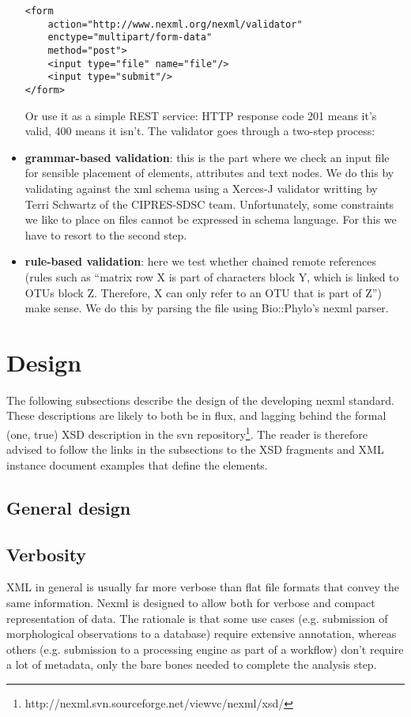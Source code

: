 \documentclass{article}
\begin{document}
\begin{itemize}
\begin{verbatim} 
<form 
    action="http://www.nexml.org/nexml/validator"
    enctype="multipart/form-data" 
    method="post"> 
    <input type="file" name="file"/> 
    <input type="submit"/>
</form> 
\end{verbatim}

Or use it as a simple REST service: HTTP response code 201 means it's
valid, 400 means it isn't. The validator goes through a two-step
process:

\item \textbf{grammar-based validation}: this is the part where we check
an input file for sensible placement of elements, attributes and text
nodes. We do this by validating against the xml schema using a Xerces-J
validator writting by Terri Schwartz of the CIPRES-SDSC team.
Unfortunately, some constraints we like to place on files cannot be
expressed in schema language. For this we have to resort to the second
step.

\item \textbf{rule-based validation}: here we test whether chained
remote references (rules such as ``matrix row X is part of characters
block Y, which is linked to OTUs block Z. Therefore, X can only refer to
an OTU that is part of Z'') make sense. We do this by parsing the file
using Bio::Phylo's nexml parser.

\end{itemize}

\section{Design} The following subsections describe the design of the
developing nexml standard. These descriptions are likely to both be in
flux, and lagging behind the formal (one, true) XSD description in the
svn
repository\footnote{http://nexml.svn.sourceforge.net/viewvc/nexml/xsd/}.
The reader is therefore advised to follow the links in the subsections
to the XSD fragments and XML instance document examples that define the
elements.

\subsection{General design}

\subsection{Verbosity} XML in general is usually far more verbose
than flat file formats that convey the same information. Nexml is
designed to allow both for verbose and compact representation of data.
The rationale is that some use cases (e.g. submission of morphological
observations to a database) require extensive annotation, whereas others
(e.g. submission to a processing engine as part of a workflow) don't
require a lot of metadata, only the bare bones needed to complete the
analysis step.
\end{document}
